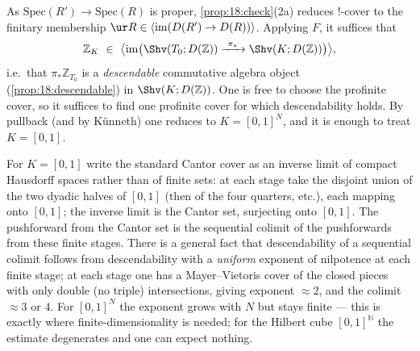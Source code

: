 \begin{remark}
\label{rmk:20:descendability}
As $\mathrm{Spec}(R')\to\mathrm{Spec}(R)$ is proper, \cref{prop:18:check}(2a)
reduces $!$-cover to the finitary membership $\ur R\in\langle\operatorname{im}
(D(R')\to D(R))\rangle$. Applying $F$, it suffices that
\begin{equation*}
\mathbb Z_K\ \in\ \bigl\langle\operatorname{im}\bigl(\Shv(T_0;D(\mathbb Z))
\xrightarrow{\ \pi_*\ }\Shv(K;D(\mathbb Z))\bigr)\bigr\rangle,
\end{equation*}
i.e.\ that $\pi_*\mathbb Z_{T_0}$ is a \emph{descendable} commutative algebra
object (\cref{prop:18:descendable}) in $\Shv(K;D(\mathbb Z))$. One is free to
choose the profinite cover, so it suffices to find one profinite cover for which
descendability holds. By pullback (and by K\"unneth) one reduces to
$K=[0,1]^N$, and it is enough to treat $K=[0,1]$.
\end{remark}

\begin{remark}
\label{rmk:20:cantor-cover}
For $K=[0,1]$ write the standard Cantor cover as an inverse limit of compact
Hausdorff spaces rather than of finite sets: at each stage take the disjoint
union of the two dyadic halves of $[0,1]$ (then of the four quarters, etc.),
each mapping onto $[0,1]$; the inverse limit is the Cantor set, surjecting onto
$[0,1]$. The pushforward from the Cantor set is the sequential colimit of the
pushforwards from these finite stages. There is a general fact that
descendability of a sequential colimit follows from descendability with a
\emph{uniform} exponent of nilpotence at each finite stage; at each stage one has
a Mayer--Vietoris cover of the closed pieces with only double (no triple)
intersections, giving exponent $\approx 2$, and the colimit $\approx 3$ or $4$.
For $[0,1]^N$ the exponent grows with $N$ but stays finite --- this is exactly
where finite-dimensionality is needed; for the Hilbert cube $[0,1]^{\mathbb N}$
the estimate degenerates and one can expect nothing.
\end{remark}

